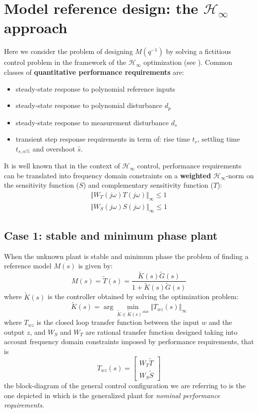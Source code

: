 \section{Model reference design: the $\mathcal{H}_\infty$ approach}
Here we consider the problem of designing $M(q^{-1})$ by solving a fictitious control problem in the framework of the $\mathcal{H}_\infty$ optimization (see \citeauthor*{cerone2020h} \cite{cerone2020h}). Common classes of \textbf{quantitative performance requirements} are: 
\begin{itemize}
    \itemsep-0.3em
    \item steady-state response to polynomial reference inputs
    \item steady-state response to polynomial disturbance $d_p$ 
    \item steady-state response to measurement disturbance $d_s$
    \item transient step response requirements in term of: rise time $t_r$, settling time $t_{s,\alpha\%}$ and overshoot $\hat{s}$.    
\end{itemize}
It is well known that in the context of $\mathcal{H}_\infty$ control, performance requirements can be translated into frequency domain constraints on a \textbf{weighted} $\mathcal{H}_\infty$-norm on the sensitivity function ($S$) and complementary sensitivity function ($T$):
\begin{align}
    \Vert W_T(j\omega) T(j\omega) \Vert_\infty \le 1\\
    \Vert W_S(j\omega) S(j\omega) \Vert_\infty \le 1
\end{align}

\subsection{Case 1: stable and minimum phase plant}
When the unknown plant is stable and minimum phase the problem of finding a reference model $M(s)$ is given by:
\begin{equation}
    M(s)=\tilde{T}(s)=\frac{\tilde{K}(s)\tilde{G}(s)}{1+\tilde{K}(s)\tilde{G}(s)}
\end{equation}
where $\tilde{K}(s)$ is the controller obtained by solving the optimization problem:
\begin{equation}
    \tilde{K}(s)=\arg\min_{\tilde{K}\in \tilde{K}(s)^{stab}} {\Vert T_{wz}(s)} \Vert_\infty
\end{equation}
where $T_{wz}$ is the closed  loop transfer function between the input $w$ and the output $z$, and $W_S$ and $W_T$ are rational transfer function designed taking into account frequency domain constraints imposed by performance requirements, that is
\begin{equation}
    T_{wz}(s)=\begin{bmatrix}
        W_T \tilde{T}\\
        W_S \tilde{S}
    \end{bmatrix}
\end{equation}
the block-diagram of the general control configuration we are referring to is the one depicted in  which is the generalized plant for \textit{nominal performance requirements}.

